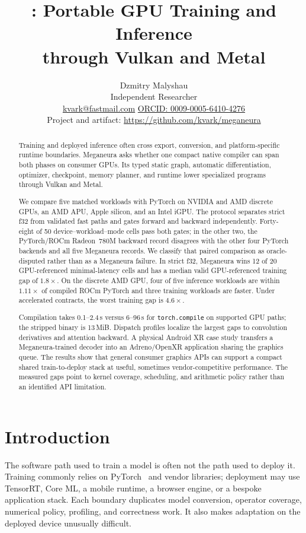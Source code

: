 \documentclass[10pt,twocolumn]{article}
\title{\system{}: Portable GPU Training and Inference\\
through Vulkan and Metal}
\author{Dzmitry Malyshau\\[-0.1em]
{\small Independent Researcher}\\[-0.1em]
{\small \href{mailto:kvark@fastmail.com}{kvark@fastmail.com}
\quad
\href{https://orcid.org/0009-0005-6410-4276}{ORCID: 0009-0005-6410-4276}}\\[-0.1em]
{\small Project and artifact: \url{https://github.com/kvark/meganeura}}}
\date{}
\newcommand{\system}{Meganeura}
\newcommand{\code}[1]{\texttt{#1}}
\begin{document}
\maketitle

\begin{abstract}
Training and deployed inference often cross export, conversion, and
platform-specific runtime boundaries. \system{} asks whether one compact
native compiler can span both phases on consumer GPUs. Its typed static graph,
automatic differentiation, optimizer, checkpoint, memory planner, and runtime
lower specialized programs through Vulkan and Metal.

We compare five matched workloads with PyTorch on NVIDIA and AMD discrete
GPUs, an AMD APU, Apple silicon, and an Intel iGPU. The protocol separates
strict f32 from validated fast paths and gates forward and backward
independently. Forty-eight of 50 device--workload--mode cells pass both gates;
in the other two, the PyTorch/ROCm Radeon~780M backward record disagrees with
the other four PyTorch backends and all five \system{} records. We classify
that paired comparison as oracle-disputed rather than as a \system{} failure.
In strict f32, \system{} wins 12 of 20 GPU-referenced
minimal-latency cells and has a median valid GPU-referenced training gap of $1.8\times$. On
the discrete AMD GPU, four of five inference workloads are within
$1.11\times$ of compiled ROCm PyTorch and three training workloads are faster.
Under accelerated contracts, the worst training gap is $4.6\times$.

Compilation takes 0.1--2.4\,s versus 6--96\,s for \code{torch.compile} on
supported GPU paths; the stripped binary is 13\,MiB. Dispatch profiles
localize the largest gaps to convolution derivatives and attention backward.
A physical Android XR case study transfers a \system{}-trained decoder into
an Adreno/OpenXR application sharing the graphics queue. The results show
that general consumer graphics APIs can support a compact shared
train-to-deploy stack at useful, sometimes vendor-competitive performance.
The measured gaps point to kernel coverage, scheduling, and arithmetic policy
rather than an identified API limitation.
\end{abstract}

\section{Introduction}

The software path used to train a model is often not the path used to deploy
it. Training commonly relies on PyTorch~\cite{paszke2019pytorch} and vendor
libraries; deployment may use TensorRT, Core ML, a mobile runtime, a browser
engine, or a bespoke application stack. Each boundary duplicates model
conversion, operator coverage, numerical policy, profiling, and correctness
work. It also makes adaptation on the deployed device unusually difficult.
\end{document}
